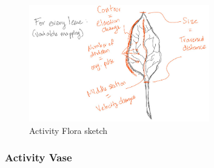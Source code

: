 \documentclass[../medieninformatik-arbeit.tex]{subfiles}
\begin{document}
\begin{figure}[h]
\captionsetup{width=0.9\textwidth}
\begin{center}
  \includegraphics[width=0.7\textwidth]{Prototype/img/ActivityFlora_detail}
  \caption{Activity Flora sketch}
\label{fig:activityflora}
\end{center}
\end{figure}


\subsubsection{Activity Vase}
\end{document}
